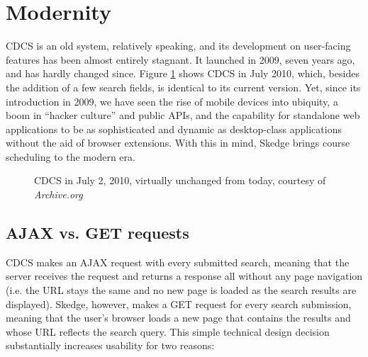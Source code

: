 
\section{Modernity}

CDCS is an old system, relatively speaking, and its development on user-facing features has been almost entirely stagnant. It launched in 2009, seven years ago, and has hardly changed since. Figure \ref{fig:cdcs2010} shows CDCS in July 2010, which, besides the addition of a few search fields, is identical to its current version. Yet, since its introduction in 2009, we have seen the rise of mobile devices into ubiquity, a boom in ``hacker culture'' and public APIs, and the capability for standalone web applications to be as sophisticated and dynamic as desktop-class applications without the aid of browser extensions. With this in mind, Skedge brings course scheduling to the modern era.

\begin{figure}[ht]
  \centering
  \caption{CDCS in July 2, 2010, virtually unchanged from today, courtesy of \emph{Archive.org}}
  \label{fig:cdcs2010}
\end{figure}

\subsection{AJAX vs. GET requests}

CDCS makes an AJAX request with every submitted search, meaning that the server receives the request and returns a response all without any page navigation (i.e. the URL stays the same and no new page is loaded as the search results are displayed). Skedge, however, makes a GET request for every search submission, meaning that the user's browser loads a new page that contains the results and whose URL reflects the search query. This simple technical design decision substantially increases usability for two reasons:

